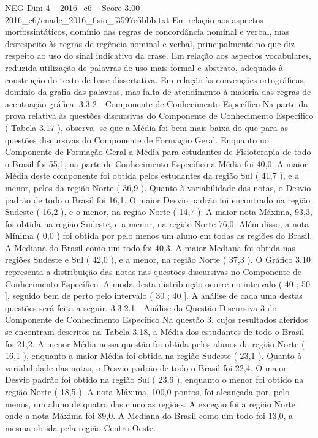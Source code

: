 \begin{textsample}{NEG Dim 4 – 2016\_c6 – Score 3.00 – 2016\_c6/enade\_2016\_fisio\_f3597e5bbb.txt}
Em relação aos aspectos morfossintáticos, domínio das regras de concordância nominal e verbal, mas desrespeito às regras de regência nominal e verbal, principalmente no que diz respeito ao uso do sinal indicativo da crase.
Em relação aos aspectos vocabulares, reduzida utilização de palavras de uso mais formal e abstrato, adequado à construção do texto de base dissertativa.
Em relação às convenções ortográficas, domínio da grafia das palavras, mas falta de atendimento à maioria das regras de acentuação gráfica. 3.3.2 - Componente de Conhecimento Específico Na parte da prova relativa às questões discursivas do Componente de Conhecimento Específico ( Tabela 3.17 ), observa -se que a Média foi bem mais baixa do que para as questões discursivas do Componente de Formação Geral.
Enquanto no Componente de Formação Geral a Média para estudantes de Fisioterapia de todo o Brasil foi 55,1, na parte de Conhecimento Específico a Média foi 40,0.
A maior Média deste componente foi obtida pelos estudantes da região Sul ( 41,7 ), e a menor, pelos da região Norte ( 36,9 ).
Quanto à variabilidade das notas, o Desvio padrão de todo o Brasil foi 16,1.
O maior Desvio padrão foi encontrado na região Sudeste ( 16,2 ), e o menor, na região Norte ( 14,7 ).
A maior nota Máxima, 93,3, foi obtida na região Sudeste, e a menor, na região Norte 76,0.
Além disso, a nota Mínima ( 0,0 ) foi obtida por pelo menos um aluno em todas as regiões do Brasil.
A Mediana do Brasil como um todo foi 40,3.
A maior Mediana foi obtida nas regiões Sudeste e Sul ( 42,0 ), e a menor, na região Norte ( 37,3 ).
O Gráfico 3.10 representa a distribuição das notas nas questões discursivas no Componente de Conhecimento Específico.
A moda desta distribuição ocorre no intervalo ( 40 ; 50 ], seguido bem de perto pelo intervalo ( 30 ; 40 ].
A análise de cada uma destas questões será feita a seguir. 3.3.2.1 - Análise da Questão Discursiva 3 do Componente de Conhecimento Específico Na questão 3, cujos resultados aferidos se encontram descritos na Tabela 3.18, a Média dos estudantes de todo o Brasil foi 21,2.
A menor Média nessa questão foi obtida pelos alunos da região Norte ( 16,1 ), enquanto a maior Média foi obtida na região Sudeste ( 23,1 ).
Quanto à variabilidade das notas, o Desvio padrão de todo o Brasil foi 22,4.
O maior Desvio padrão foi obtido na região Sul ( 23,6 ), enquanto o menor foi obtido na região Norte ( 18,5 ).
A nota Máxima, 100,0 pontos, foi alcançada por, pelo menos, um aluno de quatro das cinco as regiões.
A exceção foi a região Norte onde a nota Máxima foi 89,0.
A Mediana do Brasil como um todo foi 13,0, a mesma obtida pela região Centro-Oeste.

\end{textsample}
